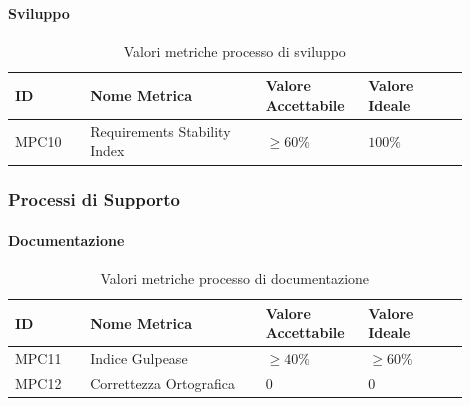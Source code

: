 \documentclass[a4paper,12pt]{article}
\begin{document}
                    \paragraph{Sviluppo} \mbox{}

                        \begin{longtable}{|M{0.15\linewidth}|M{0.35\linewidth}|M{0.2\linewidth}|M{0.2\linewidth}|}

                        \caption{Valori metriche processo di sviluppo} \\
                        \hline
                        \textbf{ID} & \textbf{Nome Metrica} & \textbf{Valore Accettabile} & \textbf{Valore Ideale} \\
                        \hline
                        \endhead

                        MPC10 & Requirements Stability Index & $\ge 60\%$ & $100\%$ \\
                        \hline

                        \end{longtable}

            \subsubsection{Processi di Supporto}
                \paragraph{Documentazione} \mbox{}
                    \begin{longtable}{|M{0.15\linewidth}|M{0.35\linewidth}|M{0.2\linewidth}|M{0.2\linewidth}|}

                        \caption{Valori metriche processo di documentazione} \\
                        \hline
                        \textbf{ID} & \textbf{Nome Metrica} & \textbf{Valore Accettabile} & \textbf{Valore Ideale} \\
                        \hline
                        \endhead

                        MPC11 & Indice Gulpease & $\ge 40\%$ & $\ge 60\%$ \\
                        \hline

                        MPC12 & Correttezza Ortografica & $0$ & $0$ \\
                        \hline

                    \end{longtable}
\end{document}
